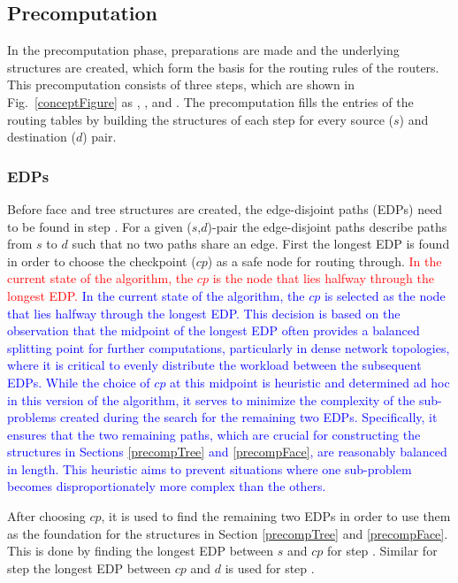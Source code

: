 \documentclass[conference]{IEEEtran}
\begin{document}
\subsection{Precomputation}
\label{precomputation}
In the precomputation phase, preparations are made and the underlying structures are created, which form the basis for the routing rules of the routers. This precomputation consists of three steps, which are shown in Fig.~\ref{conceptFigure} as , , and . The precomputation fills the entries of the routing tables by building the structures of each step for every source ($s$) and destination ($d$) pair.

\subsubsection{EDPs}
Before face and tree structures are created, the edge-disjoint paths (EDPs) need to be found in step .
For a given ($s$,$d$)-pair the edge-disjoint paths describe paths from $s$ to $d$ such that no two paths share an edge.
First the longest EDP is found in order to choose the checkpoint ($cp$) as a safe node for routing through.
\textcolor{red}{In the current state of the algorithm, the $cp$ is the node that lies halfway through the longest EDP.}
\textcolor{blue}{In the current state of the algorithm, the $cp$ is selected as the node that lies halfway through the longest EDP. 
This decision is based on the observation that the midpoint of the longest EDP often provides a balanced splitting point for further computations, particularly in dense network topologies, where it is critical to evenly distribute the workload between the subsequent EDPs.
While the choice of $cp$ at this midpoint is heuristic and determined ad hoc in this version of the algorithm, it serves to minimize the complexity of the sub-problems created during the search for the remaining two EDPs. 
Specifically, it ensures that the two remaining paths, which are crucial for constructing the structures in Sections \ref{precompTree} and \ref{precompFace}, are reasonably balanced in length.
This heuristic aims to prevent situations where one sub-problem becomes disproportionately more complex than the others.}

After choosing $cp$, it is used to find the remaining two EDPs in order to use them as the foundation for the structures in Section \ref{precompTree} and \ref{precompFace}.
This is done by finding the longest EDP between $s$ and $cp$ for step .
Similar for step  the longest EDP between $cp$ and $d$ is used for step .
\end{document}
